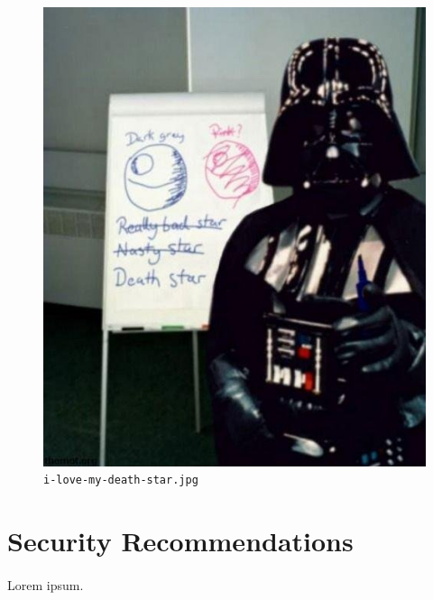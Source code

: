 \documentclass{article}
\begin{document}
\begin{figure}[H]
	\includegraphics[width=\linewidth]{resources/plans/i-love-my-death-star.jpg}
	\caption{\texttt{i-love-my-death-star.jpg}}
	\label{fig:i-love-my-death-star}
\end{figure}

\newpage

\section{Security Recommendations}
\paragraph{}
Lorem ipsum.
\end{document}
